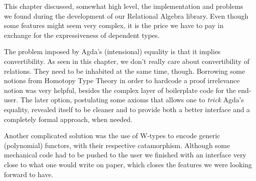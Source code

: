This chapter discussed, somewhat high level, the implementation and problems
we found during the development of our Relational Algebra library. Even though some features
might seem very complex, it is the price we have to pay in exchange for the expressiveness 
of dependent types. 

The problem imposed by Agda's (intensional) equality is that it implies
convertibility. As seen in this chapter, we don't really care about convertibility of relations.
They need to be inhabited at the same time, though. 
Borrowing some notions from Homotopy Type Theory\cite{hottbook}
in order to hardcode a proof irrelevance notion was very helpful, besides the complex layer of boilerplate
code for the end-user. The later option, postulating some axioms that allows one to \emph{trick}
Agda's equality, revealed itself to be cleaner and to provide both a better interface
and a completely formal approach, when needed.

Another complicated solution was the use of W-types to encode generic (polynomial) functors,
with their respective catamorphism. Although some mechanical code had to be pushed to the user
we finished with an interface very close to what one would write on paper, which closes
the features we were looking forward to have.


